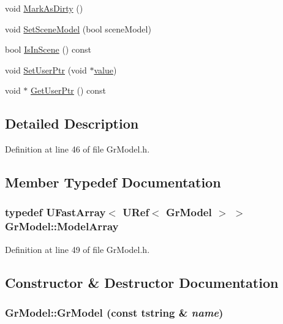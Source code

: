 \begin{CompactItemize}
void \hyperlink{class_gr_model_b29ae276eab8a6460d09a0f727765c40}{MarkAsDirty} ()
\item 
void \hyperlink{class_gr_model_905a993701b32fe30d1370deb32e35d2}{SetSceneModel} (bool sceneModel)
\item 
bool \hyperlink{class_gr_model_2c82df629316012566ad43ae802e1ed9}{IsInScene} () const 
\item 
void \hyperlink{class_gr_model_7eb54cf62bdaf0cf4e32ef5628b54bc8}{SetUserPtr} (void $\ast$\hyperlink{glext__bak_8h_6a4f8a1a444e9080b297963b3db29fe0}{value})
\item 
void $\ast$ \hyperlink{class_gr_model_32d18da9318a7541316adaa52e8e2b99}{GetUserPtr} () const 
\end{CompactItemize}


\subsection{Detailed Description}


Definition at line 46 of file GrModel.h.

\subsection{Member Typedef Documentation}
\hypertarget{class_gr_model_1bc87aacfe8601c9096280a5257679cd}{
\subsubsection[{ModelArray}]{\setlength{\rightskip}{0pt plus 5cm}typedef {\bf UFastArray}$<$ {\bf URef}$<$ {\bf GrModel} $>$ $>$ {\bf GrModel::ModelArray}}}
\label{class_gr_model_1bc87aacfe8601c9096280a5257679cd}




Definition at line 49 of file GrModel.h.

\subsection{Constructor \& Destructor Documentation}
\hypertarget{class_gr_model_4def572ffb7a4575939f3286d566ac4a}{
\subsubsection[{GrModel}]{\setlength{\rightskip}{0pt plus 5cm}GrModel::GrModel (const {\bf tstring} \& {\em name})}}
\label{class_gr_model_4def572ffb7a4575939f3286d566ac4a}




